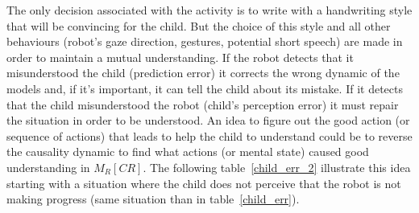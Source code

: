 \documentclass[10pt,a4paper]{article}
\begin{document}
The only decision associated with the activity is to write with a handwriting style that will be convincing for the child. 
But the choice of this style and all other behaviours (robot's gaze direction, gestures, potential short speech) are made in order to maintain a mutual understanding. 
If the robot detects that it misunderstood the child (prediction error) it corrects the wrong dynamic of the models and, if it's important, it can tell the child about its mistake. 
If it detects that the child misunderstood the robot (child's perception error) it must repair the situation in order to be understood. 
An idea to figure out the good action (or sequence of actions) that leads to help the child to understand could be to reverse the causality dynamic to find what actions (or mental state) caused good understanding in $M_R\left[CR\right]$. The following table~\ref{child_err_2} illustrate this idea starting with a situation where the child does not perceive that the robot is not making progress (same situation than in table~\ref{child_err}).
\end{document}
